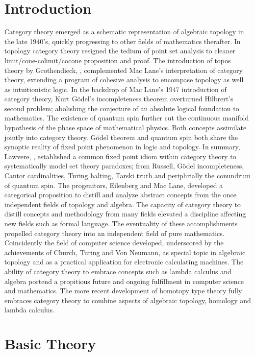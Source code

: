 \documentclass[aps,twocolumn,secnumarabic,nobalancelastpage,amsmath,amssymb,
amsthm,nofootinbib,parskip=full]{revtex4}
\numberwithin{equation}{section}
\begin{document}
\section{Introduction}
Category theory emerged as a schematic representation of
algebraic topology in the late 1940's, quickly progressing
to other fields of mathematics therafter.
In topology category theory resigned the tedium of point set analysis to
cleaner limit/cone-colimit/cocone proposition and proof.
The introduction of topos theory by Grothendieck,
\cite{grothendieck1957}, complemented Mac Lane's interpretation of
category theory, extending a program of cohesive analysis to
encompase topology as well as intuitionistic logic.
In the backdrop of Mac Lane's 1947 introduction
of category theory, Kurt G\"{o}del's incompleteness theorem overturned
Hilbrert's second problem; abolishing the conjecture of an absolute
logical foundation to mathematics.
The existence of quantum spin further cut the continuous manifold
hypothesis of the phase space of mathematical physics.
Both concepts assimilate jointly into category theory.
G\"{o}del theorem and quantum spin both share the synoptic
reality of fixed point phenomenon in logic and topology.
In summary, Lawvere, \cite{lawvere1997}, established a common
fixed point idiom within category theory to systematically model set theory 
paradoxes; from Russell, G\"{o}del incompleteness, Cantor cardinalities,
Turing halting, Tarski truth and periphrially the conundrum of quantum spin.
The progenitors, Eilenberg and Mac Lane, developed a categorical proposition to
distill and analyze abstract concepts from the once independent fields
of topology and algebra. The capacity of category theory
to distill concepts and methodology from many fields 
elevated a discipline affecting new fields such as formal language.
The eventuality of these accomplishments propelled
category theory into an independent field of pure mathematics.
Coincidently the field of computer science developed,
underscored by the achievements of Church, Turing and Von Neumann,
as special topic in algebraic topology and as a practical
application for electronic calculating machines.
The ability of category theory to embrace concepts
such as lambda calculus and algebra portend a propitious
future and ongoing fulfillment in computer science and mathematics.
The more recent development of homotopy type theory fully embraces
category theory to combine aspects of algebraic topology, homology and
lambda calculus.

\section{Basic Theory}\label{sec:basictheory}
\end{document}
